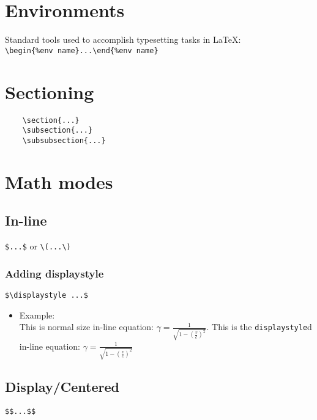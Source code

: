 \documentclass{article}
\begin{document}
\section{Environments}
Standard tools used to accomplish typesetting tasks in \LaTeX:\\
\verb!\begin{%env name}...\end{%env name}!

\section{Sectioning}
\begin{verbatim}
    \section{...}
    \subsection{...}
    \subsubsection{...}
\end{verbatim}

\section{Math modes}
\subsection{In-line }
    \verb|$...$| or \verb|\(...\)|
\subsubsection{Adding displaystyle}
    \verb!$\displaystyle ...$!
    \begin{itemize}
        \item Example:\\
    This is normal size in-line equation: $\gamma=\frac{1}{\sqrt{1-(\frac{v}{c})^{2}}}$. This is the \verb!displaystyle!d in-line equation: $\displaystyle \gamma=\frac{1}{\sqrt{1-(\frac{v}{c})^{2}}}$
    \end{itemize}


\subsection{Display/Centered}
\begin{center}
    \verb|$$...$$|
\end{center}
\end{document}
